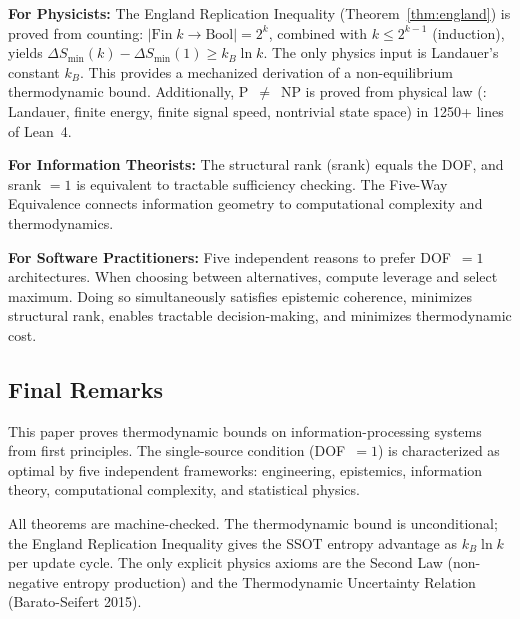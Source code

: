 \textbf{For Physicists:} The England Replication Inequality (Theorem~\ref{thm:england}) is proved from counting: $|{\mathrm{Fin}\;k \to \mathrm{Bool}}| = 2^k$, combined with $k \leq 2^{k-1}$ (induction), yields $\Delta S_{\min}(k) - \Delta S_{\min}(1) \geq k_B \ln k$. The only physics input is Landauer's constant $k_B$. This provides a mechanized derivation of a non-equilibrium thermodynamic bound. Additionally, P~$\neq$~NP is proved from physical law (: Landauer, finite energy, finite signal speed, nontrivial state space) in 1250+ lines of Lean~4.

\textbf{For Information Theorists:} The structural rank (srank) equals the DOF, and srank $= 1$ is equivalent to tractable sufficiency checking. The Five-Way Equivalence connects information geometry to computational complexity and thermodynamics.

\textbf{For Software Practitioners:} Five independent reasons to prefer DOF~$= 1$ architectures. When choosing between alternatives, compute leverage and select maximum. Doing so simultaneously satisfies epistemic coherence, minimizes structural rank, enables tractable decision-making, and minimizes thermodynamic cost.

\subsection{Final Remarks}

This paper proves thermodynamic bounds on information-processing systems from first principles. The single-source condition (DOF~$= 1$) is characterized as optimal by five independent frameworks: engineering, epistemics, information theory, computational complexity, and statistical physics.

All theorems are machine-checked. The thermodynamic bound is unconditional; the England Replication Inequality gives the SSOT entropy advantage as $k_B \ln k$ per update cycle. The only explicit physics axioms are the Second Law (non-negative entropy production) and the Thermodynamic Uncertainty Relation (Barato-Seifert 2015).


\appendix
